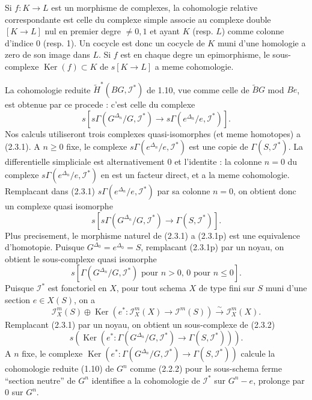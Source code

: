 \documentclass[11pt,a4paper]{article}
\theoremstyle{plain}
\theoremstyle{definition}
\DeclareMathOperator{\Ker}{Ker}
\begin{document}
Si $f : K \to L$ est un morphisme de complexes, la cohomologie relative correspondante est celle du complexe simple associe au complexe double $[K \to L]$ nul en premier degre $\neq 0, 1$ et ayant $K$ (resp. $L$) comme colonne d'indice 0 (resp. 1). Un cocycle est donc un cocycle de $K$ muni d'une homologie a zero de son image dans $L$. Si $f$ est en chaque degre un epimorphisme, le sous-complexe $\Ker(f) \subset K$ de $s[K \to L]$ a meme cohomologie.

La cohomologie reduite $\widetilde{H}^*(BG, \mathscr{I}^*)$ de 1.10, vue comme celle de $\widetilde{B}G$ mod $Be$, est obtenue par ce procede : c'est celle du complexe
\begin{equation}\label{2.3.1}
s[s\Gamma(G^{\Delta_n}/G, \mathscr{I}^*) \to s\Gamma(e^{\Delta_n}/e, \mathscr{I}^*)].
\end{equation}
Nos calculs utiliseront trois complexes quasi-isomorphes (et meme homotopes) a (2.3.1). A $n \geq 0$ fixe, le complexe $s\Gamma(e^{\Delta_n}/e, \mathscr{I}^*)$ est une copie de $\Gamma(S, \mathscr{I}^*)$. La differentielle simpliciale est alternativement 0 et l'identite : la colonne $n = 0$ du complexe $s\Gamma(e^{\Delta_n}/e, \mathscr{I}^*)$ en est un facteur direct, et a la meme cohomologie. Remplacant dans (2.3.1) $s\Gamma(e^{\Delta_n}/e, \mathscr{I}^*)$ par sa colonne $n = 0$, on obtient donc un complexe quasi isomorphe
\begin{equation}\label{2.3.1p}
s[s\Gamma(G^{\Delta_n}/G, \mathscr{I}^*) \to \Gamma(S, \mathscr{I}^*)].
\end{equation}
Plus precisement, le morphisme naturel de (2.3.1) a (2.3.1p) est une equivalence d'homotopie. Puisque $G^{\Delta_0} = e^{\Delta_0} = S$, remplacant (2.3.1p) par un noyau, on obtient le sous-complexe quasi isomorphe
\begin{equation}\label{2.3.2}
s[\Gamma(G^{\Delta_n}/G, \mathscr{I}^*) \text{ pour } n > 0, \, 0 \text{ pour } n \leq 0].
\end{equation}
Puisque $\mathscr{I}^*$ est fonctoriel en $X$, pour tout schema $X$ de type fini sur $S$ muni d'une section $e \in X(S)$, on a
\[
\mathscr{I}_X^m(S) \oplus \Ker(e^* : \mathscr{I}_X^m(X) \to \mathscr{I}^m(S)) \xrightarrow{\sim} \mathscr{I}_X^m(X).
\]
Remplacant (2.3.1) par un noyau, on obtient un sous-complexe de (2.3.2)
\begin{equation}\label{2.3.3}
s(\Ker(e^* : \Gamma(G^{\Delta_n}/G, \mathscr{I}^*) \to \Gamma(S, \mathscr{I}^*))).
\end{equation}
A $n$ fixe, le complexe $\Ker(e^* : \Gamma(G^{\Delta_n}/G, \mathscr{I}^*) \to \Gamma(S, \mathscr{I}^*))$ calcule la cohomologie reduite (1.10) de $G^n$ comme (2.2.2) pour le sous-schema ferme ``section neutre'' de $G^n$ identifiee a la cohomologie de $\mathscr{I}^*$ sur $G^n - e$, prolonge par 0 sur $G^n$.
\end{document}
